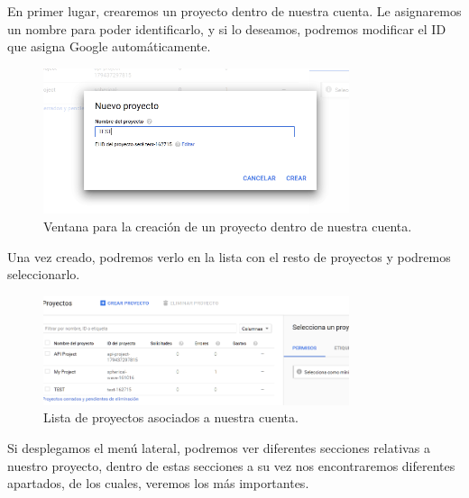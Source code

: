 
En primer lugar, crearemos un proyecto dentro de nuestra cuenta. Le asignaremos un nombre para poder identificarlo, y si lo deseamos, podremos modificar el ID que asigna Google automáticamente.

\begin{figure}[H]
\centering
  \includegraphics[width=0.8\textwidth]{Figures/anexo/google_api/create_project}
  \caption{Ventana para la creación de un proyecto dentro de nuestra cuenta.}
\end{figure}

Una vez creado, podremos verlo en la lista con el resto de proyectos y podremos seleccionarlo.

\begin{figure}[H]
\centering
  \includegraphics[width=0.8\textwidth]{Figures/anexo/google_api/project_list}
  \caption{Lista de proyectos asociados a nuestra cuenta.}
\end{figure}

Si desplegamos el menú lateral, podremos ver diferentes secciones relativas a nuestro proyecto, dentro de estas secciones a su vez nos encontraremos diferentes apartados, de los cuales, veremos los más importantes.


